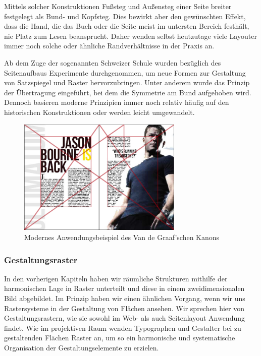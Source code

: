 \documentclass[12pt,a4paper]{article}
\begin{document}
Mittels solcher Konstruktionen Fußsteg und Außensteg einer Seite breiter festgelegt als Bund- und Kopfsteg. Dies bewirkt aber den gewünschten Effekt, dass die Hand, die das Buch oder die Seite meist im untersten Bereich festhält, nie Platz zum Lesen beansprucht. Daher wenden selbst heutzutage viele Layouter immer noch solche oder ähnliche Randverhältnisse in der Praxis an.

Ab dem Zuge der sogenannten Schweizer Schule wurden bezüglich des Seitenaufbaus Experimente durchgenommen, um neue Formen zur Gestaltung von Satzspiegel und Raster hervorzubringen. Unter anderem wurde das Prinzip der Übertragung eingeführt, bei dem die Symmetrie am Bund aufgehoben wird. Dennoch basieren moderne Prinzipien immer noch relativ häufig auf den historischen Konstruktionen oder werden leicht umgewandelt. %

\begin{figure}[htbp]
\centering
\includegraphics[width=0.7\textwidth]{Bilder/jsonBourne2.jpg}
\caption{Modernes Anwendungsbeispiel des Van de Graaf'schen Kanons\protect\footnotemark[7]}
\label{fig:modernSatz}
\end{figure}


\newpage
\subsubsection{Gestaltungsraster}
In den vorherigen Kapiteln haben wir räumliche Strukturen mithilfe der harmonischen Lage in Raster unterteilt und diese in einem zweidimensionalen Bild abgebildet. Im Prinzip haben wir einen ähnlichen Vorgang, wenn wir uns Rastersysteme in der Gestaltung von Flächen ansehen. Wir sprechen hier von Gestaltungsrastern, wie sie sowohl im Web- als auch Seitenlayout Anwendung findet. Wie im projektiven Raum wenden Typographen und Gestalter bei zu gestaltenden Flächen Raster an, um so ein harmonische und systematische Organisation der Gestaltungselemente zu erzielen.
\end{document}
